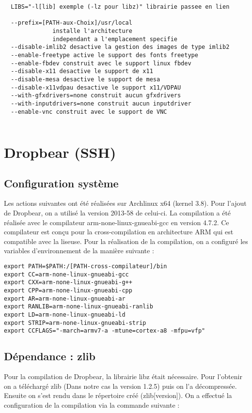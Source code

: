 \begin{lstlisting}
  LIBS="-l[lib] exemple (-lz pour libz)" librairie passee en lien
  
  --prefix=[PATH-aux-Choix]/usr/local
              installe l'architecture
              independant a l'emplacement specifie
  --disable-imlib2 desactive la gestion des images de type imlib2
  --enable-freetype active le support des fonts freetype 
  --enable-fbdev construit avec le support linux fbdev
  --disable-x11 desactive le support de x11
  --disable-mesa desactive le support de mesa
  --disable-x11vdpau desactive le support x11/VDPAU
  --with-gfxdrivers=none construit aucun gfxdrivers
  --with-inputdrivers=none construit aucun inputdriver
  --enable-vnc construit avec le support de VNC
  
\end{lstlisting}

\newpage   	
	
\section{Dropbear (SSH)}	

\subsection{Configuration système}

Les actions suivantes ont été réalisées sur Archlinux x64 (kernel 3.8).
Pour l'ajout de Dropbear, on a utilisé la version 2013-58 de celui-ci. La compilation a été réalisée avec le compilateur arm-none-linux-gnueabi-gcc en version 4.7.2. Ce compilateur est conçu pour la cross-compilation en architecture ARM qui est compatible avec la liseuse. 
Pour la réalisation de la compilation, on a configuré les variables d'environnement de la manière suivante : 

\begin{lstlisting}
export PATH=$PATH:/[PATH-cross-compilateur]/bin
export CC=arm-none-linux-gnueabi-gcc
export CXX=arm-none-linux-gnueabi-g++
export CPP=arm-none-linux-gnueabi-cpp
export AR=arm-none-linux-gnueabi-ar
export RANLIB=arm-none-linux-gnueabi-ranlib
export LD=arm-none-linux-gnueabi-ld
export STRIP=arm-none-linux-gnueabi-strip
export CCFLAGS="-march=armv7-a -mtune=cortex-a8 -mfpu=vfp"
\end{lstlisting}

\subsection{Dépendance : zlib}
Pour la compilation de Dropbear, la librairie libz était nécessaire.
Pour l'obtenir on a téléchargé zlib (Dans notre cas la version 1.2.5) puis on l'a décompressée. Ensuite on s'est rendu dans le répertoire créé (zlib[version]). On a effectué la configuration de la compilation via la commande suivante :

